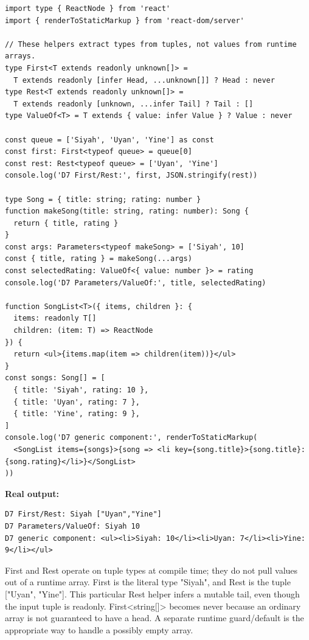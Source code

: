 \documentclass[
  10pt,
  a4paper,
  titlepage]{article}
\begin{document}
\Needspace{82.4pt}
\begin{lstlisting}[language=TSX]
import type { ReactNode } from 'react'
import { renderToStaticMarkup } from 'react-dom/server'

// These helpers extract types from tuples, not values from runtime arrays.
type First<T extends readonly unknown[]> =
  T extends readonly [infer Head, ...unknown[]] ? Head : never
type Rest<T extends readonly unknown[]> =
  T extends readonly [unknown, ...infer Tail] ? Tail : []
type ValueOf<T> = T extends { value: infer Value } ? Value : never

const queue = ['Siyah', 'Uyan', 'Yine'] as const
const first: First<typeof queue> = queue[0]
const rest: Rest<typeof queue> = ['Uyan', 'Yine']
console.log('D7 First/Rest:', first, JSON.stringify(rest))

type Song = { title: string; rating: number }
function makeSong(title: string, rating: number): Song {
  return { title, rating }
}
const args: Parameters<typeof makeSong> = ['Siyah', 10]
const { title, rating } = makeSong(...args)
const selectedRating: ValueOf<{ value: number }> = rating
console.log('D7 Parameters/ValueOf:', title, selectedRating)

function SongList<T>({ items, children }: {
  items: readonly T[]
  children: (item: T) => ReactNode
}) {
  return <ul>{items.map(item => children(item))}</ul>
}
const songs: Song[] = [
  { title: 'Siyah', rating: 10 },
  { title: 'Uyan', rating: 7 },
  { title: 'Yine', rating: 9 },
]
console.log('D7 generic component:', renderToStaticMarkup(
  <SongList items={songs}>{song => <li key={song.title}>{song.title}: {song.rating}</li>}</SongList>
))
\end{lstlisting}


\textbf{Real output:}

\Needspace{51.5pt}
\begin{lstlisting}
D7 First/Rest: Siyah ["Uyan","Yine"]
D7 Parameters/ValueOf: Siyah 10
D7 generic component: <ul><li>Siyah: 10</li><li>Uyan: 7</li><li>Yine: 9</li></ul>
\end{lstlisting}

First and Rest operate on tuple types at compile time; they do not pull
values out of a runtime array. First is the literal type "Siyah", and
Rest is the tuple {[}"Uyan", "Yine"{]}. This particular Rest helper
infers a mutable tail, even though the input tuple is readonly.
First\textless string{[}{]}\textgreater{} becomes never because an
ordinary array is not guaranteed to have a head. A separate runtime
guard/default is the appropriate way to handle a possibly empty array.
\end{document}
